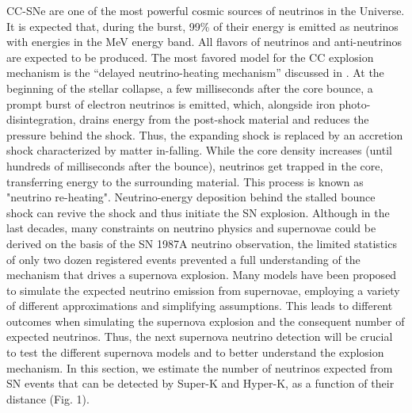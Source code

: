 \documentclass[twocolumn]{aastex631}
\begin{document}
CC-SNe are one of the most powerful cosmic sources of neutrinos in the Universe. It is expected that, during the burst,  99\% of their energy is emitted as neutrinos with energies in the MeV energy band.
All flavors of neutrinos and anti-neutrinos are expected to be produced. The most favored model for the CC explosion mechanism is the “delayed neutrino-heating mechanism” discussed in \cite{Bethe:1985sox}.
At the beginning of the stellar collapse, a few milliseconds after the core bounce, a prompt burst of electron neutrinos is emitted, which, alongside iron photo-disintegration, drains energy from the post-shock material and reduces the pressure behind the shock. Thus, the expanding shock is replaced by an accretion shock characterized by matter in-falling. 
While the core density increases (until hundreds of milliseconds after the bounce), neutrinos get trapped in the core, transferring energy to the surrounding material. This process is known as "neutrino re-heating". Neutrino-energy deposition behind the stalled bounce shock can revive the shock and thus initiate the SN explosion. Although in the last decades, many constraints on neutrino physics and supernovae could be derived on the basis of the SN 1987A neutrino observation, the limited statistics of only two dozen registered events prevented a full understanding of the mechanism that drives a supernova explosion. Many models have been proposed to simulate the expected neutrino emission from supernovae, employing a variety of different approximations and simplifying assumptions. This leads to different outcomes when simulating the supernova explosion and the consequent number of expected neutrinos. Thus, the next supernova neutrino detection will be crucial to test the different supernova models and to better understand the explosion mechanism. In this section, we estimate the number of neutrinos expected from SN events that can be detected by Super-K and Hyper-K, as a function of their distance (Fig. 1). 
\end{document}
